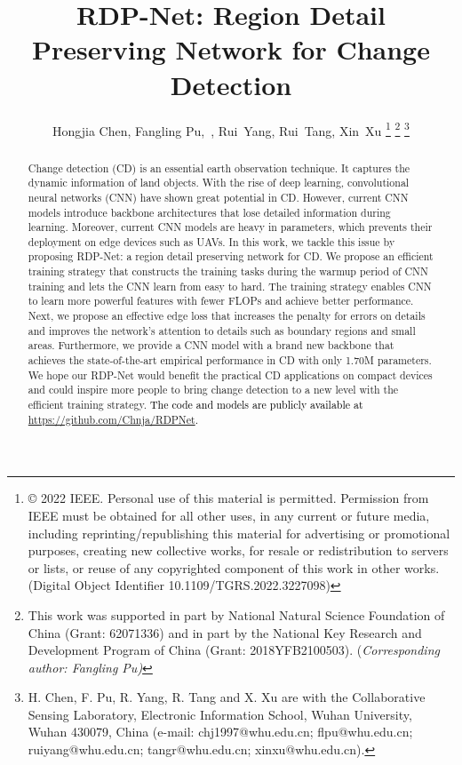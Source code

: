\documentclass[lettersize,journal]{IEEEtran}
\newcommand{\editc}[1]{\textcolor{black}{#1}}
\begin{document}
\title{RDP-Net: Region Detail Preserving Network for Change Detection}



\author{Hongjia Chen,
Fangling Pu,~,
Rui~Yang,
Rui~Tang,
Xin~Xu
\thanks{© 2022 IEEE.  Personal use of this material is permitted.  Permission from IEEE must be obtained for all other uses, in any current or future media, including reprinting/republishing this material for advertising or promotional purposes, creating new collective works, for resale or redistribution to servers or lists, or reuse of any copyrighted component of this work in other works.
(Digital Object Identifier 10.1109/TGRS.2022.3227098)}
\thanks{
This work was supported in part by National Natural Science Foundation of China (Grant: 62071336) and in part by the National Key Research and Development Program of China (Grant: 2018YFB2100503). (\textit{Corresponding author: Fangling Pu)}}
\thanks{
H. Chen, F. Pu, R. Yang, R. Tang and X. Xu are with the Collaborative Sensing Laboratory, Electronic Information School, Wuhan University, Wuhan 430079, China (e-mail: chj1997@whu.edu.cn; flpu@whu.edu.cn; ruiyang@whu.edu.cn; tangr@whu.edu.cn; xinxu@whu.edu.cn).}
}




\maketitle

\begin{abstract}
Change detection (CD) is an essential earth observation technique. It captures the dynamic information of land objects. With the rise of deep learning, convolutional neural networks (CNN) have shown great potential in CD. However, current CNN models introduce backbone architectures that lose detailed information during learning. Moreover, current CNN models are heavy in parameters, which prevents their deployment on edge devices such as UAVs.
In this work, we tackle this issue by proposing RDP-Net: a region detail preserving network for CD.
We propose an efficient training strategy that constructs the training tasks during the warmup period of CNN training and lets the CNN learn from easy to hard.
The training strategy enables CNN to learn more powerful features with fewer FLOPs and achieve better performance.
Next, we propose an effective edge loss that increases the penalty for errors on details and improves the network's attention to details such as boundary regions and small areas.
Furthermore, we provide a CNN model with a brand new backbone that achieves the state-of-the-art empirical performance in CD with only 1.70M parameters.
We hope our RDP-Net would benefit the practical CD applications on compact devices and could inspire more people to bring change detection to a new level with the efficient training strategy.
\editc{The code and models are publicly available at \url{https://github.com/Chnja/RDPNet}.}
\end{abstract}
\end{document}
